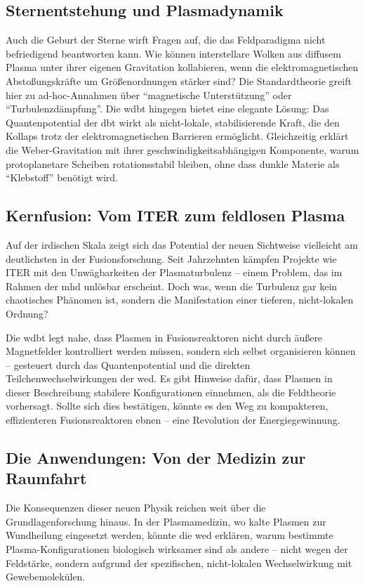 \subsection{Sternentstehung und Plasmadynamik}
Auch die Geburt der Sterne wirft Fragen auf, die das Feldparadigma nicht befriedigend beantworten kann. Wie können interstellare Wolken aus diffusem Plasma unter ihrer eigenen
Gravitation kollabieren, wenn die elektromagnetischen Abstoßungskräfte um Größenordnungen stärker sind? Die Standardtheorie greift hier zu ad-hoc-Annahmen über
\enquote{magnetische Unterstützung} oder \enquote{Turbulenzdämpfung}. Die \gls{wdbt} hingegen bietet eine elegante Lösung: Das Quantenpotential der \gls{dbt} wirkt als nicht-lokale,
stabilisierende Kraft, die den Kollaps trotz der elektromagnetischen Barrieren ermöglicht. Gleichzeitig erklärt die Weber-Gravitation mit ihrer geschwindigkeitsabhängigen Komponente,
warum protoplanetare Scheiben rotationsstabil bleiben, ohne dass dunkle Materie als \enquote{Klebstoff} benötigt wird.

\subsection{Kernfusion: Vom ITER zum feldlosen Plasma}
Auf der irdischen Skala zeigt sich das Potential der neuen Sichtweise vielleicht am deutlichsten in der Fusionsforschung. Seit Jahrzehnten kämpfen Projekte wie ITER mit den
Unwägbarkeiten der Plasmaturbulenz – einem Problem, das im Rahmen der \gls{mhd} unlösbar erscheint. Doch was, wenn die Turbulenz gar kein chaotisches Phänomen ist,
sondern die Manifestation einer tieferen, nicht-lokalen Ordnung?

Die \gls{wdbt} legt nahe, dass Plasmen in Fusionsreaktoren nicht durch äußere Magnetfelder kontrolliert werden müssen, sondern sich selbst organisieren können – gesteuert durch
das Quantenpotential und die direkten Teilchenwechselwirkungen der \gls{wed}. Es gibt Hinweise dafür, dass Plasmen in dieser Beschreibung stabilere Konfigurationen
einnehmen, als die Feldtheorie vorhersagt. Sollte sich dies bestätigen, könnte es den Weg zu kompakteren, effizienteren Fusionsreaktoren ebnen – eine Revolution der Energiegewinnung.

\subsection{Die Anwendungen: Von der Medizin zur Raumfahrt}
Die Konsequenzen dieser neuen Physik reichen weit über die Grundlagenforschung hinaus. In der Plasmamedizin, wo kalte Plasmen zur Wundheilung eingesetzt werden, könnte die
\gls{wed} erklären, warum bestimmte Plasma-Konfigurationen biologisch wirksamer sind als andere – nicht wegen der Feldstärke, sondern aufgrund der spezifischen,
nicht-lokalen Wechselwirkung mit Gewebemolekülen.

